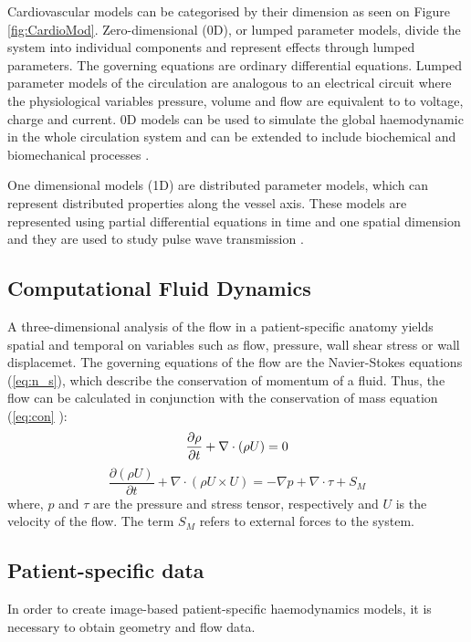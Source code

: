 Cardiovascular models can be categorised by their dimension as seen on Figure \ref{fig:CardioMod}. Zero-dimensional (0D), or lumped parameter models, divide the system into individual components and represent effects through lumped parameters. The governing equations are ordinary differential equations. Lumped parameter models of the circulation are analogous to an electrical circuit where the physiological variables pressure, volume and flow are equivalent to to voltage, charge and current. 0D models can be used to simulate the global haemodynamic in the whole circulation system \cite{Zhou2019APressure} and can be extended to include biochemical and biomechanical processes \cite{Hose2019CardiovascularNext}. \par

One dimensional models (1D) are distributed parameter models, which can represent distributed properties along the vessel axis. These models are represented using partial differential equations in time and one spatial dimension and they are used to study pulse wave transmission \cite{Zhou2019APressure, Hose2019CardiovascularNext}. \par 

\subsection{Computational Fluid Dynamics}
A three-dimensional analysis of the flow in a patient-specific anatomy yields spatial and temporal on variables such as flow, pressure, wall shear stress or wall displacemet. The governing equations of the flow are the Navier-Stokes equations (\ref{eq:n_s}), which describe the conservation of momentum of a fluid.
Thus, the flow can be calculated in conjunction with the conservation of mass equation (\ref{eq:con} ):
\begin{equation}
\frac{\partial \rho}{\partial t}+\nabla \cdot (\rho U) = 0 \\
\label{eq:con}
\end{equation}
\begin{equation}
\frac{\partial (\rho U)}{\partial t}+\nabla \cdot (\rho U \times U) = -\nabla p + \nabla \cdot \tau + S_{M}
\label{eq:n_s}
\end{equation}
where, $p$ and $\tau$ are the pressure and stress tensor, respectively and $U$ is the velocity of the flow. The term $S_M$ refers to external forces to the system. \par

\subsection{Patient-specific data}
In order to create image-based patient-specific haemodynamics models, it is necessary to obtain geometry and flow data. \par

